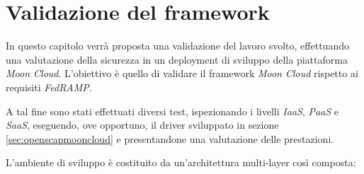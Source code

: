 \documentclass[../main.tex]{subfiles}
\begin{document}
\chapter{Validazione del framework}
In questo capitolo verrà proposta una validazione del lavoro svolto, effettuando una valutazione della sicurezza in un deployment di sviluppo della piattaforma \textit{Moon Cloud}.
L'obiettivo è quello di validare il framework \textit{Moon Cloud} rispetto ai requisiti \textit{FedRAMP}.

A tal fine sono stati effettuati diversi test, ispezionando i livelli \textit{IaaS}, \textit{PaaS} e \textit{SaaS},
eseguendo, ove opportuno, il driver sviluppato in sezione \ref{sec:openscapmooncloud} e presentandone una valutazione delle prestazioni.  

L'ambiente di sviluppo è costituito da un'architettura multi-layer così composta:
\end{document}

